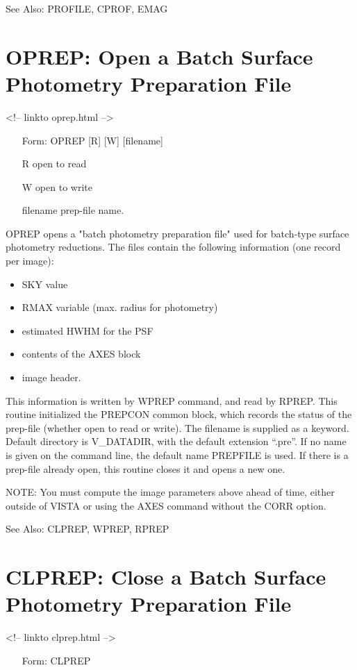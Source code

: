See Also:  PROFILE, CPROF, EMAG


\section{OPREP: Open a Batch Surface Photometry Preparation File}
\begin{rawhtml}
<!-- linkto oprep.html -->
\end{rawhtml}
\begin{itemize}
  \item[Form: OPREP {[R]} {[W]} {[filename]}\hfill]{}
  \item[R]{open to read}
  \item[W]{open to write}
  \item[filename]{prep-file name.}
\end{itemize}

OPREP opens a "batch photometry preparation file" used for batch-type
surface photometry reductions.  The files contain the following information
(one record per image):
\begin{itemize}
  \item{SKY value}
  \item{RMAX variable (max. radius for photometry)}
  \item{estimated HWHM for the PSF}
  \item{contents of the AXES block}
  \item{image header.}
\end{itemize}

This information is written by WPREP command, and read by RPREP.  This
routine initialized the PREPCON common block, which records the status of
the prep-file (whether open to read or write).  The filename is supplied as
a keyword.  Default directory is V\_DATADIR, with the default extension
``.pre''.  If no name is given on the command line, the default name
PREPFILE is used.  If there is a prep-file already open, this routine closes
it and opens a new one.

NOTE: You must compute the image parameters above ahead of time, either
outside of VISTA or using the AXES command without the CORR option.

See Also:  CLPREP, WPREP, RPREP


\section{CLPREP: Close a Batch Surface Photometry Preparation File}
\begin{rawhtml}
<!-- linkto clprep.html -->
\end{rawhtml}
\begin{itemize}
  \item[Form: CLPREP\hfill]{}
\end{itemize}

